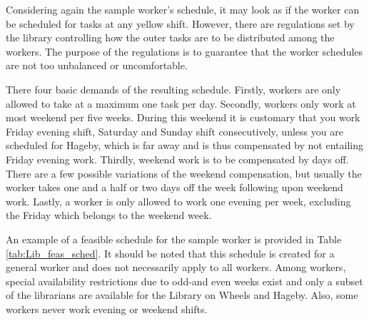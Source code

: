 Considering again the sample worker's schedule, it may look as if the worker can be scheduled for tasks at any yellow shift. However, there are regulations set by the library controlling how the outer tasks are to be distributed among the workers. The purpose of the regulations is to guarantee that the worker schedules are not too unbalanced or uncomfortable. 

There four basic demands of the resulting schedule. Firstly, workers are only allowed to take at a maximum one task per day. Secondly, workers only work at most weekend per five weeks. During this weekend it is customary that you work Friday evening shift, Saturday and Sunday shift consecutively, unless you are scheduled for Hageby, which is far away and is thus compensated by not entailing Friday evening work. Thirdly, weekend work is to be compensated by days off. There are a few possible variations of the weekend compensation, but usually the worker takes one and a half or two days off the week following upon weekend work. Lastly, a worker is only allowed to work one evening per week, excluding the Friday which belongs to the weekend week.
%
%

An example of a feasible schedule for the sample worker is provided in Table \ref{tab:Lib_feas_sched}. It should be noted that this schedule is created for a general worker and does not necessarily apply to all workers. Among workers, special availability restrictions due to odd-and even weeks exist and only a subset of the librarians are available for the Library on Wheels and Hageby. Also, some workers never work evening or weekend shifts.  

